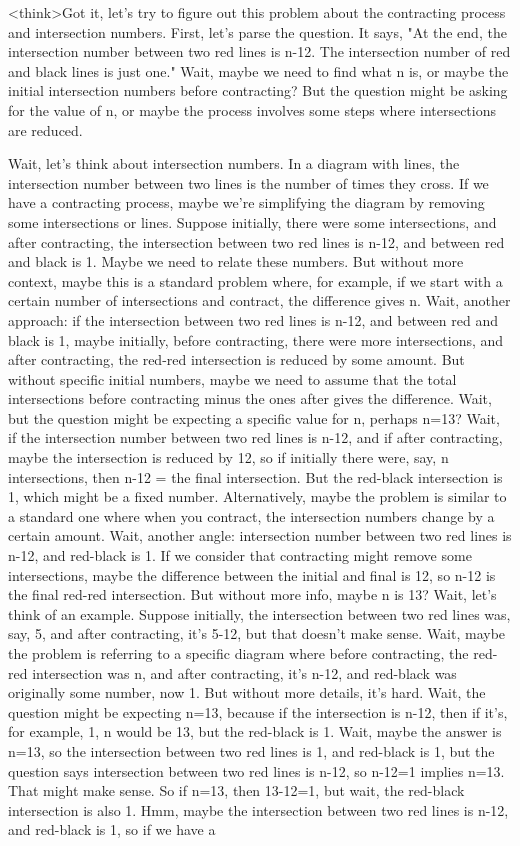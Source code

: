<think>Got it, let's try to figure out this problem about the contracting process and intersection numbers. First, let's parse the question. It says, "At the end, the intersection number between two red lines is n-12. The intersection number of red and black lines is just one." Wait, maybe we need to find what n is, or maybe the initial intersection numbers before contracting? But the question might be asking for the value of n, or maybe the process involves some steps where intersections are reduced. 

Wait, let's think about intersection numbers. In a diagram with lines, the intersection number between two lines is the number of times they cross. If we have a contracting process, maybe we're simplifying the diagram by removing some intersections or lines. Suppose initially, there were some intersections, and after contracting, the intersection between two red lines is n-12, and between red and black is 1. Maybe we need to relate these numbers. But without more context, maybe this is a standard problem where, for example, if we start with a certain number of intersections and contract, the difference gives n. Wait, another approach: if the intersection between two red lines is n-12, and between red and black is 1, maybe initially, before contracting, there were more intersections, and after contracting, the red-red intersection is reduced by some amount. But without specific initial numbers, maybe we need to assume that the total intersections before contracting minus the ones after gives the difference. Wait, but the question might be expecting a specific value for n, perhaps n=13? Wait, if the intersection number between two red lines is n-12, and if after contracting, maybe the intersection is reduced by 12, so if initially there were, say, n intersections, then n-12 = the final intersection. But the red-black intersection is 1, which might be a fixed number. Alternatively, maybe the problem is similar to a standard one where when you contract, the intersection numbers change by a certain amount. Wait, another angle: intersection number between two red lines is n-12, and red-black is 1. If we consider that contracting might remove some intersections, maybe the difference between the initial and final is 12, so n-12 is the final red-red intersection. But without more info, maybe n is 13? Wait, let's think of an example. Suppose initially, the intersection between two red lines was, say, 5, and after contracting, it's 5-12, but that doesn't make sense. Wait, maybe the problem is referring to a specific diagram where before contracting, the red-red intersection was n, and after contracting, it's n-12, and red-black was originally some number, now 1. But without more details, it's hard. Wait, the question might be expecting n=13, because if the intersection is n-12, then if it's, for example, 1, n would be 13, but the red-black is 1. Wait, maybe the answer is n=13, so the intersection between two red lines is 1, and red-black is 1, but the question says intersection between two red lines is n-12, so n-12=1 implies n=13. That might make sense. So if n=13, then 13-12=1, but wait, the red-black intersection is also 1. Hmm, maybe the intersection between two red lines is n-12, and red-black is 1, so if we have a 